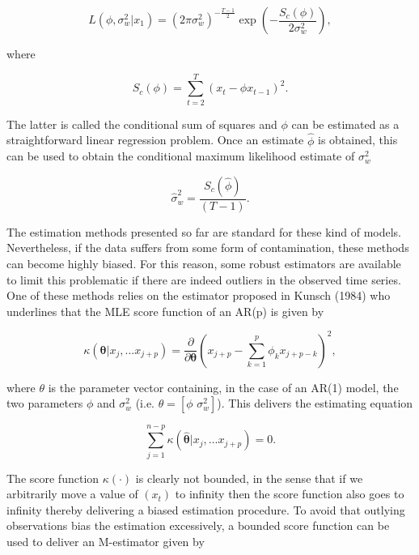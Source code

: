 \documentclass[]{book}
\theoremstyle{definition}
\theoremstyle{definition}
\theoremstyle{definition}
\theoremstyle{remark}
\begin{document}
\begin{equation*}
L(\phi,\sigma_w^2|x_1) = (2\pi \sigma_w^2)^{-\frac{T-1}{2}} \exp \left(-\frac{S_c(\phi)}{2 \sigma_w^2}\right),
\end{equation*}

where

\begin{equation*}
S_c(\phi) = \sum_{t=2}^T (x_t -\phi x_{t-1})^2 .
\end{equation*}

The latter is called the conditional sum of squares and \(\phi\) can be
estimated as a straightforward linear regression problem. Once an
estimate \(\hat{\phi}\) is obtained, this can be used to obtain the
conditional maximum likelihood estimate of \(\sigma_w^2\)

\begin{equation*}
\hat{\sigma}_w^2 = \frac{S_c(\hat{\phi})}{(T-1)} .
\end{equation*}

The estimation methods presented so far are standard for these kind of
models. Nevertheless, if the data suffers from some form of
contamination, these methods can become highly biased. For this reason,
some robust estimators are available to limit this problematic if there
are indeed outliers in the observed time series. One of these methods
relies on the estimator proposed in Kunsch (1984) who underlines that
the MLE score function of an AR(p) is given by

\begin{equation*}
 \kappa(\mathbf{\theta}|x_j,...x_{j+p}) = \frac{\partial}{\partial \mathbf{\theta}} (x_{j+p} - \sum_{k=1}^p \phi_k x_{j+p-k})^2,
\end{equation*}

where \(\theta\) is the parameter vector containing, in the case of an
AR(1) model, the two parameters \(\phi\) and \(\sigma_w^2\) (i.e.
\(\theta = [\phi \,\, \sigma_w^2]\)). This delivers the estimating
equation

\begin{equation*}
\sum_{j=1}^{n-p} \kappa (\hat{\mathbf{\theta}}|x_j,...x_{j+p}) = 0 .
\end{equation*}

The score function \(\kappa(\cdot)\) is clearly not bounded, in the
sense that if we arbitrarily move a value of \((x_t)\) to infinity then
the score function also goes to infinity thereby delivering a biased
estimation procedure. To avoid that outlying observations bias the
estimation excessively, a bounded score function can be used to deliver
an M-estimator given by
\end{document}
